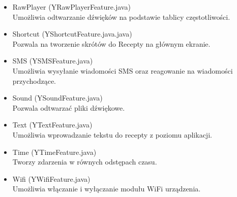 \documentclass[11pt,a4paper,polish,thesis]{dcsbook}
\begin{document}
\begin{itemize}
\item{RawPlayer (YRawPlayerFeature.java)}\\
Umożliwia odtwarzanie dźwięków na podstawie tablicy częstotliwości.

\item{Shortcut (YShortcutFeature.java.java)}\\
Pozwala na tworzenie skrótów do Recepty na głównym ekranie.

\item{SMS (YSMSFeature.java)}\\
Umożliwia wysyłanie wiadomości SMS oraz reagowanie na wiadomości przychodzące.

\item{Sound (YSoundFeature.java)}\\
Pozwala odtwarzać pliki dźwiękowe.

\item{Text (YTextFeature.java)}\\
Umożliwia wprowadzanie tekstu do recepty z poziomu aplikacji.

\item{Time (YTimeFeature.java)}\\
Tworzy zdarzenia w równych odstępach czasu.

\item{Wifi (YWifiFeature.java)}\\
Umożliwia włączanie i wyłączanie modułu WiFi urządzenia.

\end{itemize}
\end{document}
